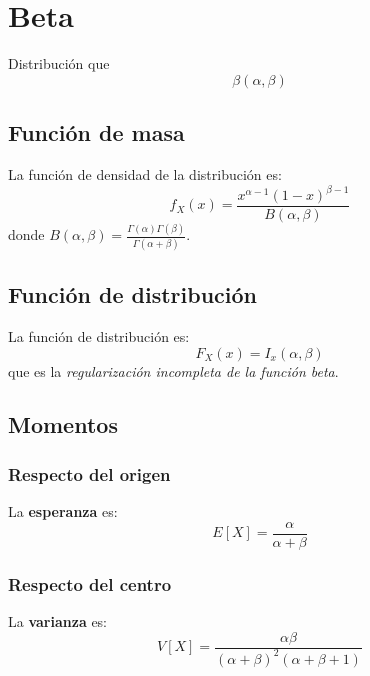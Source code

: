 \section{Beta}
\label{sec:beta}
Distribución que %
\[
\boxed{\beta\left( \alpha, \beta \right)}
\]

\subsection{Función de masa}
La función de densidad de la distribución es:
\[
f_X \left( x \right) = \frac{x^{\alpha - 1} \left( 1 - x \right)^{\beta - 1}}{B\left( \alpha, \beta \right)}
\]
donde $B\left( \alpha, \beta \right) = \frac{\Gamma\left( \alpha \right)\Gamma\left( \beta \right)}{\Gamma\left( \alpha + \beta \right)}$.

\subsection{Función de distribución}
La función de distribución es:
\[
F_X\left( x \right) = I_x\left( \alpha, \beta \right)
\]
que es la \textit{regularización incompleta de la función beta}.%

\subsection{Momentos}

\subsubsection*{Respecto del origen}
La \textbf{esperanza} es: 
\[
    E\left[ X \right] = \frac{\alpha}{\alpha + \beta}
\]
\subsubsection*{Respecto del centro}
La \textbf{varianza} es:
\[
    V\left[ X \right] = \frac{\alpha \beta}{\left( \alpha + \beta \right)^2 \left( \alpha + \beta + 1 \right)}
\]

